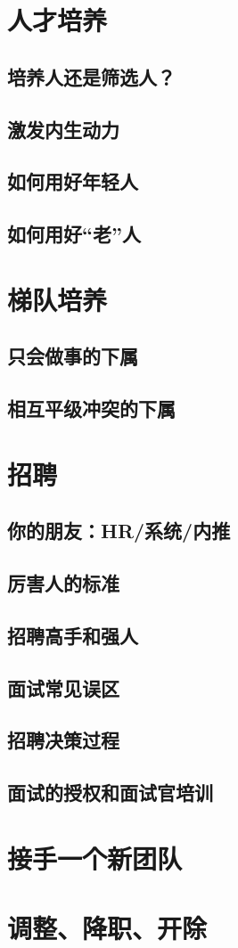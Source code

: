 
\section{人才培养}
\subsection{培养人还是筛选人？}
\subsection{激发内生动力}
\subsection{如何用好年轻人}
\subsection{如何用好“老”人}

\section{梯队培养}
\subsection{只会做事的下属}
\subsection{相互平级冲突的下属}

\section{招聘}
\subsection{你的朋友：HR/系统/内推}
\subsection{厉害人的标准} %
\subsection{招聘高手和强人} %
\subsection{面试常见误区}
\subsection{招聘决策过程}
\subsection{面试的授权和面试官培训}

\section{接手一个新团队}

\section{调整、降职、开除}

